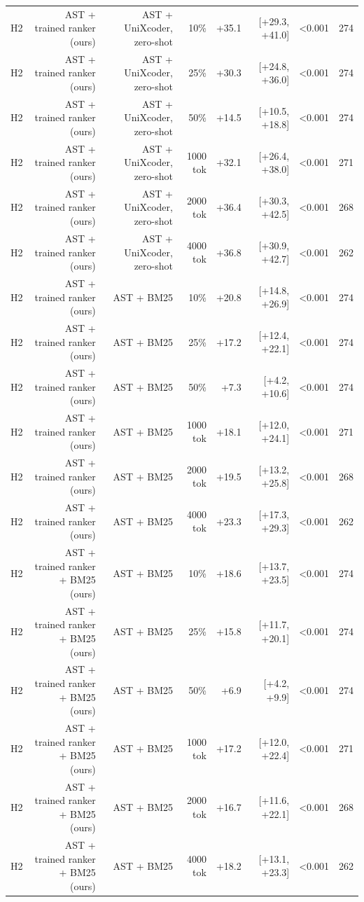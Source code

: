 \begin{tabular}{lrrrrrrr}
H2 & AST + trained ranker (ours) & AST + UniXcoder, zero-shot & 10\% & +35.1 & [+29.3, +41.0] & <0.001 & 274 \\
H2 & AST + trained ranker (ours) & AST + UniXcoder, zero-shot & 25\% & +30.3 & [+24.8, +36.0] & <0.001 & 274 \\
H2 & AST + trained ranker (ours) & AST + UniXcoder, zero-shot & 50\% & +14.5 & [+10.5, +18.8] & <0.001 & 274 \\
H2 & AST + trained ranker (ours) & AST + UniXcoder, zero-shot & 1000 tok & +32.1 & [+26.4, +38.0] & <0.001 & 271 \\
H2 & AST + trained ranker (ours) & AST + UniXcoder, zero-shot & 2000 tok & +36.4 & [+30.3, +42.5] & <0.001 & 268 \\
H2 & AST + trained ranker (ours) & AST + UniXcoder, zero-shot & 4000 tok & +36.8 & [+30.9, +42.7] & <0.001 & 262 \\
H2 & AST + trained ranker (ours) & AST + BM25 & 10\% & +20.8 & [+14.8, +26.9] & <0.001 & 274 \\
H2 & AST + trained ranker (ours) & AST + BM25 & 25\% & +17.2 & [+12.4, +22.1] & <0.001 & 274 \\
H2 & AST + trained ranker (ours) & AST + BM25 & 50\% & +7.3 & [+4.2, +10.6] & <0.001 & 274 \\
H2 & AST + trained ranker (ours) & AST + BM25 & 1000 tok & +18.1 & [+12.0, +24.1] & <0.001 & 271 \\
H2 & AST + trained ranker (ours) & AST + BM25 & 2000 tok & +19.5 & [+13.2, +25.8] & <0.001 & 268 \\
H2 & AST + trained ranker (ours) & AST + BM25 & 4000 tok & +23.3 & [+17.3, +29.3] & <0.001 & 262 \\
H2 & AST + trained ranker + BM25 (ours) & AST + BM25 & 10\% & +18.6 & [+13.7, +23.5] & <0.001 & 274 \\
H2 & AST + trained ranker + BM25 (ours) & AST + BM25 & 25\% & +15.8 & [+11.7, +20.1] & <0.001 & 274 \\
H2 & AST + trained ranker + BM25 (ours) & AST + BM25 & 50\% & +6.9 & [+4.2, +9.9] & <0.001 & 274 \\
H2 & AST + trained ranker + BM25 (ours) & AST + BM25 & 1000 tok & +17.2 & [+12.0, +22.4] & <0.001 & 271 \\
H2 & AST + trained ranker + BM25 (ours) & AST + BM25 & 2000 tok & +16.7 & [+11.6, +22.1] & <0.001 & 268 \\
H2 & AST + trained ranker + BM25 (ours) & AST + BM25 & 4000 tok & +18.2 & [+13.1, +23.3] & <0.001 & 262 \\

\end{tabular}
